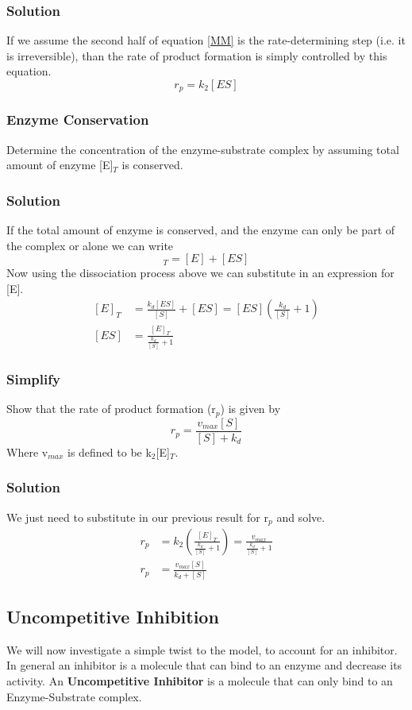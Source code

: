 \documentclass{article}
\newcommand{\be}{\begin{equation}}
\newcommand{\ee}{\end{equation}}
\begin{document}
\subsubsection*{Solution}
If we assume the second half of equation \ref{MM} is the rate-determining step (i.e. it is irreversible), than the rate of product formation is simply controlled by this equation. 
\be
r_p = k_2[ES]
\ee

\subsubsection{Enzyme Conservation}
Determine the concentration of the enzyme-substrate complex by assuming total amount of enzyme [E]$_T$ is conserved. 

\subsubsection*{Solution}
If the total  amount of enzyme is conserved, and  the enzyme can only be part of the complex or alone we can write
\be
[E]_T = [E] + [ES]
\ee
Now using the dissociation process above we can substitute in an expression for [E].
\be
\begin{split}
[E]_T &= \frac{k_d[ES]}{[S]} + [ES] = [ES] \left(\frac{k_d}{[S]}+1\right)\\
[ES] &= \frac{[E]_T}{\frac{k_d}{[S]}+1}
\end{split}
\ee

\subsubsection{Simplify}
Show that the rate of product formation (r$_p$) is given by 
\be
r_p = \frac{v_{max}[S]}{[S] + k_d}
\ee
Where v$_{max}$ is defined to be k$_2$[E]$_T$. 

\subsubsection*{Solution}
We just need to substitute in our previous result for r$_p$ and solve.
\be
\begin{split}
r_p &= k_2 \left(\frac{[E]_T}{\frac{k_d}{[S]}+1}\right) = \frac{v_{max}}{\frac{k_d}{[S]}+1}\\
r_p &= \frac{v_{max}[S]}{k_d + [S]}
\end{split}
\ee

\subsection{Uncompetitive Inhibition}
We will now investigate a simple twist to the model, to account for an inhibitor.
In general an inhibitor is a molecule that can bind to an enzyme and decrease its activity. 
An \textbf{Uncompetitive Inhibitor}  is a molecule that can only bind to an Enzyme-Substrate complex. 
\end{document}
